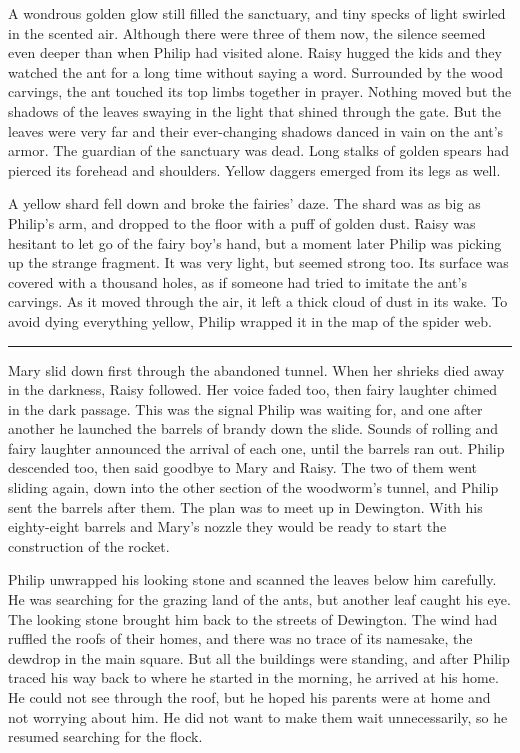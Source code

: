 \documentclass[10pt]{memoir}
\renewcommand{\pfbreakdisplay}{\bigskip \ding{166} \bigskip}
\newcommand{\secbreak}{\fancybreak{\pfbreakdisplay}}
\begin{document}
A wondrous golden glow still filled the sanctuary, and tiny specks of light
swirled in the scented air. Although there were three of them now, the silence
seemed even deeper than when Philip had visited alone. Raisy hugged the kids
and they watched the ant for a long time without saying a word. Surrounded by
the wood carvings, the ant touched its top limbs together in prayer. Nothing
moved but the shadows of the leaves swaying in the light that shined through
the gate. But the leaves were very far and their ever-changing shadows danced
in vain on the ant's armor. The guardian of the sanctuary was dead. Long stalks
of golden spears had pierced its forehead and shoulders. Yellow daggers emerged
from its legs as well.

A yellow shard fell down and broke the fairies' daze. The shard was as big as
Philip's arm, and dropped to the floor with a puff of golden dust. Raisy was
hesitant to let go of the fairy boy's hand, but a moment later Philip was
picking up the strange fragment. It was very light, but seemed strong too. Its
surface was covered with a thousand holes, as if someone had tried to imitate
the ant's carvings. As it moved through the air, it left a thick cloud of dust
in its wake. To avoid dying everything yellow, Philip wrapped it in the map of
the spider web.

\secbreak

Mary slid down first through the abandoned tunnel. When her shrieks died away
in the darkness, Raisy followed. Her voice faded too, then fairy laughter
chimed in the dark passage. This was the signal Philip was waiting for, and one
after another he launched the barrels of brandy down the slide. Sounds of
rolling and fairy laughter announced the arrival of each one, until the barrels
ran out. Philip descended too, then said goodbye to Mary and Raisy. The two of
them went sliding again, down into the other section of the woodworm's tunnel,
and Philip sent the barrels after them. The plan was to meet up in Dewington.
With his eighty-eight barrels and Mary's nozzle they would be ready to start
the construction of the rocket.

Philip unwrapped his looking stone and scanned the leaves below him carefully.
He was searching for the grazing land of the ants, but another leaf caught his
eye. The looking stone brought him back to the streets of Dewington. The wind
had ruffled the roofs of their homes, and there was no trace of its namesake,
the dewdrop in the main square. But all the buildings were standing, and after
Philip traced his way back to where he started in the morning, he arrived at
his home. He could not see through the roof, but he hoped his parents were at
home and not worrying about him. He did not want to make them wait
unnecessarily, so he resumed searching for the flock.
\end{document}

